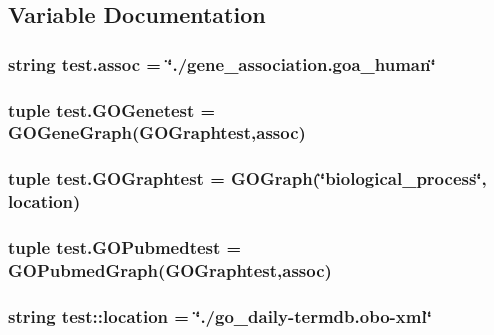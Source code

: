 \subsection{Variable Documentation}
\hypertarget{namespacetest_adb8b1e2a5df72522e42bc012571e75cd}{
\subsubsection[{assoc}]{\setlength{\rightskip}{0pt plus 5cm}string {\bf test.assoc} = \char`\"{}./gene\_\-association.goa\_\-human\char`\"{}}}
\label{namespacetest_adb8b1e2a5df72522e42bc012571e75cd}
\hypertarget{namespacetest_ab48a47ac8dcf21d32cff24c492f085c1}{
\subsubsection[{GOGenetest}]{\setlength{\rightskip}{0pt plus 5cm}tuple {\bf test.GOGenetest} = {\bf GOGeneGraph}({\bf GOGraphtest},{\bf assoc})}}
\label{namespacetest_ab48a47ac8dcf21d32cff24c492f085c1}
\hypertarget{namespacetest_a49256f3800de70e9aabf11ea0c3bb8e1}{
\subsubsection[{GOGraphtest}]{\setlength{\rightskip}{0pt plus 5cm}tuple {\bf test.GOGraphtest} = {\bf GOGraph}(\char`\"{}biological\_\-process\char`\"{}, location)}}
\label{namespacetest_a49256f3800de70e9aabf11ea0c3bb8e1}
\hypertarget{namespacetest_a2565076d50762c7d466830ecbabb1671}{
\subsubsection[{GOPubmedtest}]{\setlength{\rightskip}{0pt plus 5cm}tuple {\bf test.GOPubmedtest} = {\bf GOPubmedGraph}({\bf GOGraphtest},{\bf assoc})}}
\label{namespacetest_a2565076d50762c7d466830ecbabb1671}
\hypertarget{namespacetest_a4ee7d63d9426ae32ba96ad2f0e171511}{
\subsubsection[{location}]{\setlength{\rightskip}{0pt plus 5cm}string {\bf test::location} = \char`\"{}./go\_\-daily-\/termdb.obo-\/xml\char`\"{}}}
\label{namespacetest_a4ee7d63d9426ae32ba96ad2f0e171511}
